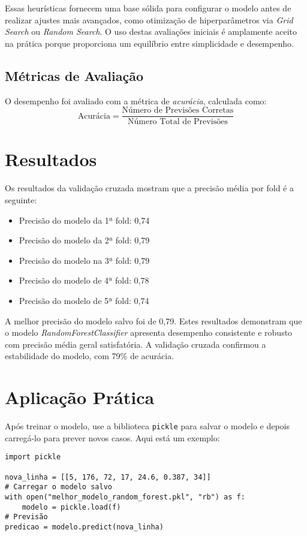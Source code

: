 \documentclass[a4paper,12pt]{article}
\begin{document}
Essas heurísticas fornecem uma base sólida para configurar o modelo antes de realizar ajustes mais avançados, como otimização de hiperparâmetros via \textit{Grid Search} ou \textit{Random Search}. O uso destas avaliações iniciais é amplamente aceito na prática porque proporciona um equilíbrio entre simplicidade e desempenho.

\subsection{Métricas de Avaliação}
O desempenho foi avaliado com a métrica de \textit{acurácia}, calculada como:
\[
\text{Acurácia} = \frac{\text{Número de Previsões Corretas}}{\text{Número Total de Previsões}}
\]

\section{Resultados}
\singlespacing

Os resultados da validação cruzada mostram que a precisão média por fold é a seguinte:

\begin{itemize}
    \item Precisão do modelo da 1ª fold: 0,74
    \item Precisão do modelo da 2ª fold: 0,79
    \item Precisão do modelo na 3ª fold: 0,79
    \item Precisão do modelo de 4ª fold: 0,78
    \item Precisão do modelo de 5ª fold: 0,74
\end{itemize}

A melhor precisão do modelo salvo foi de 0,79.
Estes resultados demonstram que o modelo \textit{RandomForestClassifier} apresenta desempenho consistente e robusto com precisão média geral satisfatória. A validação cruzada confirmou a estabilidade do modelo, com 79\% de acurácia.


\section{Aplicação Prática}

Após treinar o modelo, use a biblioteca \texttt{pickle} para salvar o modelo e depois carregá-lo para prever novos casos. Aqui está um exemplo:

\begin{verbatim}
import pickle

nova_linha = [[5, 176, 72, 17, 24.6, 0.387, 34]]
# Carregar o modelo salvo
with open("melhor_modelo_random_forest.pkl", "rb") as f:
    modelo = pickle.load(f)
# Previsão
predicao = modelo.predict(nova_linha)
\end{verbatim}
\end{document}
